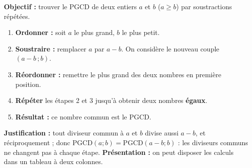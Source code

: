 \documentclass[11pt]{article}
\begin{document}
\begin{methode}
\textbf{Objectif :} trouver le PGCD de deux entiers $a$ et $b$ ($a \ge b$) par soustractions répétées.
\begin{enumerate}
    \item \textbf{Ordonner :} soit $a$ le plus grand, $b$ le plus petit.
    \item \textbf{Soustraire :} remplacer $a$ par $a - b$. On considère le nouveau couple $(a-b \,; b)$.
    \item \textbf{Réordonner :} remettre le plus grand des deux nombres en première position.
    \item \textbf{Répéter} les étapes 2 et 3 jusqu'à obtenir deux nombres \textbf{égaux}.
    \item \textbf{Résultat :} ce nombre commun est le PGCD.
\end{enumerate}
\textbf{Justification :} tout diviseur commun à $a$ et $b$ divise aussi $a - b$, et réciproquement ; donc $\text{PGCD}(a; b) = \text{PGCD}(a-b; b)$ : les diviseurs communs ne changent pas à chaque étape.
\textbf{Présentation :} on peut disposer les calculs dans un tableau à deux colonnes.
\end{methode}
\end{document}
